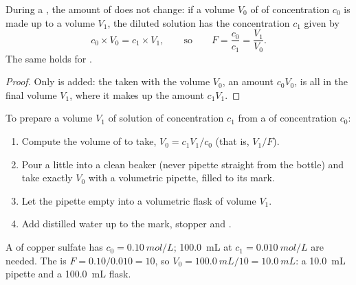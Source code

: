 \begin{proposition}\label{prop:g10:concentration-and-dilution:kept}
During a , the amount of  does not change: if a volume
$V_0$ of  of concentration $c_0$ is made up to a volume
$V_1$, the diluted solution has the concentration $c_1$ given by
\[
  c_0 \times V_0 = c_1 \times V_1,
  \qquad\text{so}\qquad
  F = \frac{c_0}{c_1} = \frac{V_1}{V_0} .
\]
The same holds for .
\end{proposition}

\begin{proof}
Only  is added: the  taken with the volume $V_0$, an amount
$c_0 V_0$, is all in the final volume $V_1$, where it makes up the
amount $c_1 V_1$.
\end{proof}


\begin{method}\label{met:g10:concentration-and-dilution:diluting}
To prepare a volume $V_1$ of solution of concentration $c_1$ from a
 of concentration $c_0$:
\begin{enumerate}
  \item Compute the volume of  to take,
        $V_0 = c_1 V_1 / c_0$ (that is, $V_1 / F$).
  \item Pour a little  into a clean beaker (never pipette
        straight from the bottle) and take exactly $V_0$ with a
        volumetric pipette, filled to its mark.
  \item Let the pipette empty into a volumetric flask of volume $V_1$.
  \item Add distilled water up to the mark, stopper and .
\end{enumerate}
\end{method}

\begin{example}\label{ex:g10:concentration-and-dilution:tenfold}
A  of copper sulfate has $c_0 = \qty{0.10}{mol/L}$;
\qty{100.0}{mL} at $c_1 = \qty{0.010}{mol/L}$ are needed. The  is $F = 0.10 / 0.010 = 10$, so $V_0 = \qty{100.0}{mL} / 10 =
\qty{10.0}{mL}$: a \qty{10.0}{mL} pipette and a \qty{100.0}{mL} flask.
\end{example}


